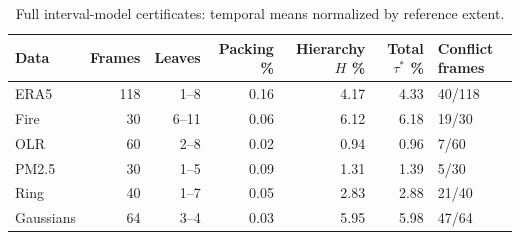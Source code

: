 \begin{table}[t]
\caption{Full interval-model certificates: temporal means normalized by reference extent.}\label{tab:cert}
\centering\footnotesize
\setlength{\tabcolsep}{3pt}
\begin{tabular}{lrrrrrl}\toprule
Data & Frames & Leaves & Packing \% & Hierarchy $H$ \% & Total $\tau^*$ \% & Conflict frames\\\midrule
ERA5 & 118 & 1--8 & 0.16 & 4.17 & 4.33 & 40/118\\
Fire & 30 & 6--11 & 0.06 & 6.12 & 6.18 & 19/30\\
OLR & 60 & 2--8 & 0.02 & 0.94 & 0.96 & 7/60\\
PM2.5 & 30 & 1--5 & 0.09 & 1.31 & 1.39 & 5/30\\
Ring & 40 & 1--7 & 0.05 & 2.83 & 2.88 & 21/40\\
Gaussians & 64 & 3--4 & 0.03 & 5.95 & 5.98 & 47/64\\
\bottomrule\end{tabular}
\par{}
\end{table}
